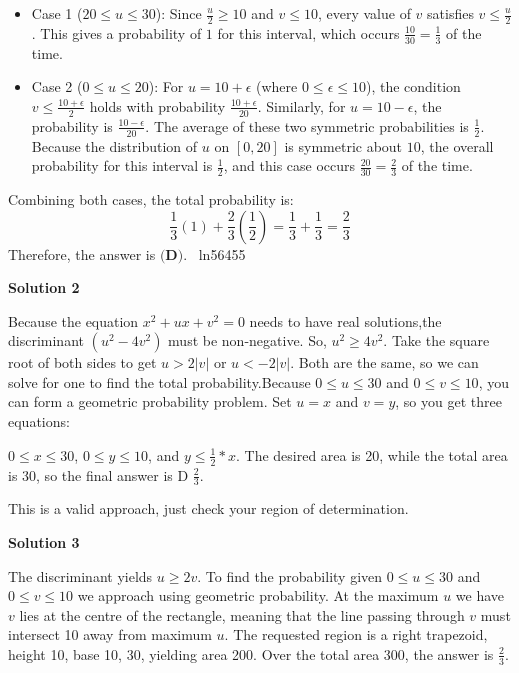 \begin{enumerate}
 
            \begin{itemize}
        \item Case 1 ($20 \leq u \leq 30$): Since $\frac{u}{2} \geq 10$ and $v \leq 10$, every value of $v$ satisfies $v \leq \frac{u}{2}$. This gives a probability of $1$ for this interval, which occurs $\frac{10}{30} = \frac{1}{3}$ of the time.
        \item Case 2 ($0 \leq u \leq 20$): For $u = 10 + \epsilon$ (where $0 \leq \epsilon \leq 10$), the condition $v \leq \frac{10 + \epsilon}{2}$ holds with probability $\frac{10 + \epsilon}{20}$. Similarly, for $u = 10 - \epsilon$, the probability is $\frac{10 - \epsilon}{20}$. The average of these two symmetric probabilities is $\frac{1}{2}$. Because the distribution of $u$ on $[0, 20]$ is symmetric about $10$, the overall probability for this interval is $\frac{1}{2}$, and this case occurs $\frac{20}{30} = \frac{2}{3}$ of the time.
            \end{itemize}
            Combining both cases, the total probability is:
 \[\frac{1}{3}(1) + \frac{2}{3}\left(\frac{1}{2}\right) = \frac{1}{3} + \frac{1}{3} = \frac{2}{3}\]Therefore, the answer is $\boxed{\textbf{(D)}}$. ~ln56455

 



\textbf{Solution 2}

Because the equation $x^2 + ux + v^2 = 0$ needs to have real solutions,the discriminant $(u^2 - 4v^2)$ must be non-negative. So, $u^2 \geq 4v^2$. Take the square root of both sides to get $u>2|v|$ or $u<-2|v|$. Both are the same, so we can solve for one to find the total probability.Because $0 \leq u \leq 30$ and $0 \leq v \leq 10$, you can form a geometric probability problem. Set $u=x$ and $v=y$, so you get three equations:

 $0 \leq x \leq 30$, $0 \leq y \leq 10$, and $y \leq \frac{1}{2} * x$. The desired area is 20, while the total area is 30, so the final answer is $\boxed{\text{D}}$ $\frac{2}{3}$.

 This is a valid approach, just check your region of determination.

 



\textbf{Solution 3}

The discriminant yields $u \geq 2v$. To find the probability given $0 \leq u \leq 30$ and $0 \leq v \leq 10$ we approach using geometric probability. At the maximum $u$ we have $v$ lies at the centre of the rectangle, meaning that the line passing through $v$ must intersect 10 away from maximum $u$. The requested region is a right trapezoid, height 10, base 10, 30, yielding area 200. Over the total area 300, the answer is $\boxed{\frac{2}{3}}$.


\end{enumerate}
